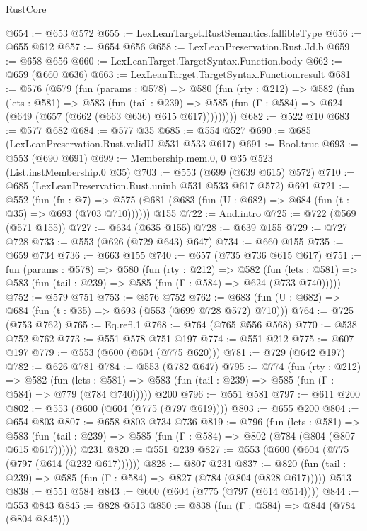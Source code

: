 \begin{lexlean}{RustCore}
\begin{coremodule}
@654 := @653 @572
@655 := LexLeanTarget.RustSemantics.fallibleType
@656 := @655 @612
@657 := @654 @656
@658 := LexLeanPreservation.Rust.Jd.b
@659 := @658 @656
@660 := LexLeanTarget.TargetSyntax.Function.body
@662 := @659 (@660 @636)
@663 := LexLeanTarget.TargetSyntax.Function.result
@681 := @576
    (@579
      (fun (params : @578) =>
      @580
        (fun (rty : @212) =>
        @582
          (fun (lets : @581) =>
          @583
            (fun (tail : @239) =>
            @585 (fun (Γ : @584) => @624 (@649 (@657 (@662 (@663 @636) @615 @617)))))))))
@682 := @522 @10
@683 := @577 @682
@684 := @577 @35
@685 := @554 @527
@690 := @685 (LexLeanPreservation.Rust.validU @531 @533 @617)
@691 := Bool.true
@693 := @553 (@690 @691)
@699 := Membership.mem.{0, 0} @35 @523 (List.instMembership.{0} @35)
@703 := @553 (@699 (@639 @615) @572)
@710 := @685 (LexLeanPreservation.Rust.uninh @531 @533 @617 @572) @691
@721 := @552
    (fun (fn : @7) =>
    @575 (@681 (@683 (fun (U : @682) => @684 (fun (t : @35) => @693 (@703 @710))))))
    @155
@722 := And.intro
@725 := @722 (@569 (@571 @155))
@727 := @634 (@635 @155)
@728 := @639 @155
@729 := @727 @728
@733 := @553 (@626 (@729 @643) @647)
@734 := @660 @155
@735 := @659 @734
@736 := @663 @155
@740 := @657 (@735 @736 @615 @617)
@751 := fun (params : @578) =>
  @580
    (fun (rty : @212) =>
    @582
      (fun (lets : @581) => @583 (fun (tail : @239) => @585 (fun (Γ : @584) => @624 (@733 @740)))))
@752 := @579 @751
@753 := @576 @752
@762 := @683 (fun (U : @682) => @684 (fun (t : @35) => @693 (@553 (@699 @728 @572) @710)))
@764 := @725 (@753 @762)
@765 := Eq.refl.{1}
@768 := @764 (@765 @556 @568)
@770 := @538 @752 @762
@773 := @551 @578 @751 @197
@774 := @551 @212
@775 := @607 @197
@779 := @553 (@600 (@604 (@775 @620)))
@781 := @729 (@642 @197)
@782 := @626 @781
@784 := @553 (@782 @647)
@795 := @774
    (fun (rty : @212) =>
    @582
      (fun (lets : @581) => @583 (fun (tail : @239) => @585 (fun (Γ : @584) => @779 (@784 @740)))))
    @200
@796 := @551 @581
@797 := @611 @200
@802 := @553 (@600 (@604 (@775 (@797 @619))))
@803 := @655 @200
@804 := @654 @803
@807 := @658 @803 @734 @736
@819 := @796
    (fun (lets : @581) =>
    @583 (fun (tail : @239) => @585 (fun (Γ : @584) => @802 (@784 (@804 (@807 @615 @617))))))
    @231
@820 := @551 @239
@827 := @553 (@600 (@604 (@775 (@797 (@614 (@232 @617))))))
@828 := @807 @231
@837 := @820 (fun (tail : @239) => @585 (fun (Γ : @584) => @827 (@784 (@804 (@828 @617))))) @513
@838 := @551 @584
@843 := @600 (@604 (@775 (@797 (@614 @514))))
@844 := @553 @843
@845 := @828 @513
@850 := @838 (fun (Γ : @584) => @844 (@784 (@804 @845)))

\end{coremodule}
\end{lexlean}
